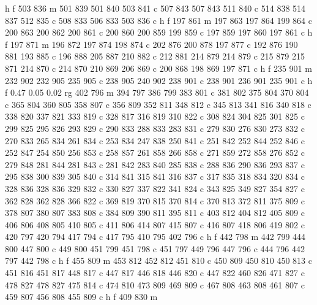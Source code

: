 {{        h f
        503 836 m
        501 839 501 840 503 841 c
        507 843 507 843 511 840 c
        514 838 514 837 512 835 c
        508 833 506 833 503 836 c
        h f
        197 861 m
        197 863 197 864 199 864 c
        200 863 200 862 200 861 c
        200 860 200 859 199 859 c
        197 859 197 860 197 861 c
        h f
        197 871 m
        196 872 197 874 198 874 c
        202 876 200 878 197 877 c
        192 876 190 881 193 885 c
        196 888 205 887 210 882 c
        212 881 214 879 214 879 c
        215 879 215 871 214 870 c
        214 870 210 869 206 869 c
        200 868 198 869 197 871 c
        h f
        235 901 m
        232 902 232 905 235 905 c
        238 905 240 902 238 901 c
        238 901 236 901 235 901 c
        h f
        0.47 0.05 0.02 rg
        402 796 m
        394 797 386 799 383 801 c
        381 802 375 804 370 804 c
        365 804 360 805 358 807 c
        356 809 352 811 348 812 c
        345 813 341 816 340 818 c
        338 820 337 821 333 819 c
        328 817 316 819 310 822 c
        308 824 304 825 301 825 c
        299 825 295 826 293 829 c
        290 833 288 833 283 831 c
        279 830 276 830 273 832 c
        270 833 265 834 261 834 c
        253 834 247 838 250 841 c
        251 842 252 844 252 846 c
        252 847 254 850 256 853 c
        258 857 261 858 266 858 c
        271 859 272 858 276 852 c
        279 848 281 844 281 843 c
        281 842 283 840 285 838 c
        288 836 290 836 293 837 c
        295 838 300 839 305 840 c
        314 841 315 841 316 837 c
        317 835 318 834 320 834 c
        328 836 328 836 329 832 c
        330 827 337 822 341 824 c
        343 825 349 827 354 827 c
        362 828 362 828 366 822 c
        369 819 370 815 370 814 c
        370 813 372 811 375 809 c
        378 807 380 807 383 808 c
        384 809 390 811 395 811 c
        403 812 404 812 405 809 c
        406 806 408 805 410 805 c
        411 806 414 807 415 807 c
        416 807 418 806 419 802 c
        420 797 420 794 417 794 c
        417 795 410 795 402 796 c
        h f
        442 798 m
        442 799 444 800 447 800 c
        449 800 451 799 451 798 c
        451 797 449 796 447 796 c
        444 796 442 797 442 798 c
        h f
        455 809 m
        453 812 452 812 451 810 c
        450 809 450 810 450 813 c
        451 816 451 817 448 817 c
        447 817 446 818 446 820 c
        447 822 460 826 471 827 c
        478 827 478 827 475 814 c
        474 810 473 809 469 809 c
        467 808 463 808 461 807 c
        459 807 456 808 455 809 c
        h f
        409 830 m
}}
